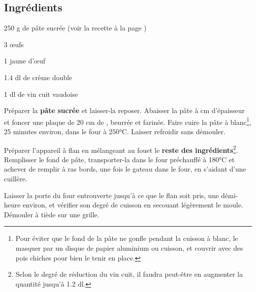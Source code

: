 \newpage
{}

\subsection*{Ingrédients}
\begin{ingredients}
	\item 250 g de pâte sucrée (voir la recette à la page \pageref{bundner_nusstorte})
	\item 3 \oe ufs
	\item 1 jaune d'\oe uf
	\item 1.4 dl de crème double
	\item 1 dl de vin cuit vaudoise
\end{ingredients}

\medskip

Préparer la \textbf{pâte sucrée} et laisser-la reposer. 
Abaisser la pâte à  cm d'épaisseur et foncer une plaque de 20 cm de \diameter, beurrée et farinée. 
Faire cuire la pâte à blanc\footnote{Pour éviter que le fond de la pâte ne gonfle pendant la cuisson à blanc, le masquer par un disque de papier aluminium ou cuisson, et couvrir avec des pois chiches pour bien le tenir en place.}, 25 minutes environ, dans le four à 250°C. 
Laisser refroidir sans démouler. 

Préparer l'appareil à flan en mélangeant au fouet le \textbf{reste des ingrédients}\footnote{Selon le degré de réduction du vin cuit, il faudra peut-être en augmenter la quantité jusqu'à 1.2 dl.}. 
Remplisser le fond de pâte, transporter-la dans le four préchauffé à 180°C et achever de remplir à ras bords, une fois le gateau dans le four, en s'aidant d'une cuillère.

Laisser la porte du four entrouverte jusqu'à ce que le flan soit pris, une démi-heure environ, et vérifier son degré de cuisson en secouant légèrement le moule. 
Démouler à tiède sur une grille.


\vspace*{0.75 cm}

\begin{recipeblock}
	\noindent 
\end{recipeblock}